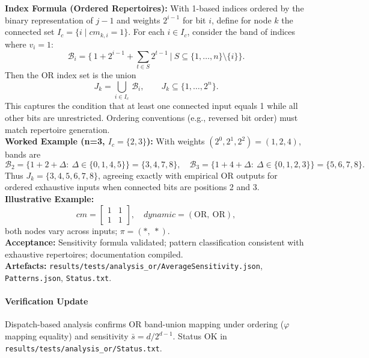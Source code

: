 \documentclass[11pt]{article}
\begin{document}
\textbf{Index Formula (Ordered Repertoires):} With 1-based indices ordered by the binary representation of \(j-1\) and weights \(2^{i-1}\) for bit \(i\), define for node \(k\) the connected set \(I_c=\{i\mid cm_{k,i}=1\}\). For each \(i\in I_c\), consider the band of indices where \(v_i=1\):
\[
\mathcal{B}_i=\Big\{\,1+2^{i-1}+\sum_{t\in S}2^{t-1}\ \Big|\ S\subseteq\{1,\dots,n\}\setminus\{i\}\Big\}.
\]
Then the OR index set is the union
\[
J_k=\bigcup_{i\in I_c}\,\mathcal{B}_i,\qquad J_k\subseteq\{1,\dots,2^n\}.
\]
This captures the condition that at least one connected input equals 1 while all other bits are unrestricted. Ordering conventions (e.g., reversed bit order) must match repertoire generation.\\
\textbf{Worked Example (n=3, \(I_c=\{2,3\}\)):} With weights \((2^{0},2^{1},2^{2})=(1,2,4)\), bands are
\[
\mathcal{B}_2=\{1+2+\Delta:\ \Delta\in\{0,1,4,5\}\}=\{3,4,7,8\},\quad \mathcal{B}_3=\{1+4+\Delta:\ \Delta\in\{0,1,2,3\}\}=\{5,6,7,8\}.
\]
Thus \(J_k=\{3,4,5,6,7,8\}\), agreeing exactly with empirical OR outputs for ordered exhaustive inputs when connected bits are positions 2 and 3.
\textbf{Illustrative Example:}
\[
cm = \begin{bmatrix}1 & 1\\ 1 & 1\end{bmatrix},\quad dynamic=(\text{OR},\ \text{OR}),
\]
both nodes vary across inputs; \(\pi=(*,\ *)\).\\
\textbf{Acceptance:} Sensitivity formula validated; pattern classification consistent with exhaustive repertoires; documentation compiled.\\
\textbf{Artefacts:} \texttt{results/tests/analysis\_or/AverageSensitivity.json}, \texttt{Patterns.json}, \texttt{Status.txt}.
\paragraph{Verification Update} Dispatch-based analysis confirms OR band-union mapping under ordering (\(\varphi\) mapping equality) and sensitivity \(\bar{s}=d/2^{d-1}\). Status OK in \texttt{results/tests/analysis\_or/Status.txt}.
\end{document}
